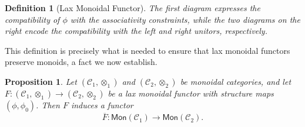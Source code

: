 \documentclass{amsart}
\newtheorem{proposition}{Proposition}[section]
\newtheorem{definition}{Definition}[section]
\begin{document}
\begin{definition}[Lax Monoidal Functor]
The first diagram expresses the compatibility of $\phi$ with the associativity constraints, while the two diagrams on the right encode the compatibility with the left and right unitors, respectively.
\end{definition}

This definition is precisely what is needed to ensure that lax monoidal functors preserve monoids, a fact we now establish.

\begin{proposition}\label{prop:lax_lifts_monoids}
Let $(\mathcal{C}_1, \otimes_1)$ and $(\mathcal{C}_2, \otimes_2)$ be monoidal categories, and let $F \colon (\mathcal{C}_1, \otimes_1) \longrightarrow (\mathcal{C}_2, \otimes_2)$ be a lax monoidal functor with structure maps $(\phi, \phi_0)$. Then $F$ induces a functor
\[
\overline{F} \colon \mathsf{Mon}(\mathcal{C}_1) \longrightarrow \mathsf{Mon}(\mathcal{C}_2).
\]
\end{proposition}
\end{document}

